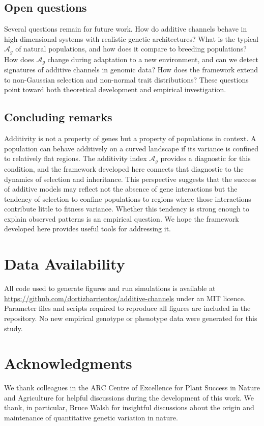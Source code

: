 \documentclass[9pt,twocolumn,twoside,lineno]{gsajnl}
\newcommand{\Ag}{\ensuremath{\mathcal{A}_{g}}\xspace}
\begin{document}
\subsection{Open questions}

Several questions remain for future work. How do additive channels behave in high-dimensional systems with realistic genetic architectures? What is the typical \Ag of natural populations, and how does it compare to breeding populations? How does \Ag change during adaptation to a new environment, and can we detect signatures of additive channels in genomic data? How does the framework extend to non-Gaussian selection and non-normal trait distributions? These questions point toward both theoretical development and empirical investigation.

\subsection{Concluding remarks}

Additivity is not a property of genes but a property of populations in context. A population can behave additively on a curved landscape if its variance is confined to relatively flat regions. The additivity index \Ag provides a diagnostic for this condition, and the framework developed here connects that diagnostic to the dynamics of selection and inheritance. This perspective suggests that the success of additive models may reflect not the absence of gene interactions but the tendency of selection to confine populations to regions where those interactions contribute little to fitness variance. Whether this tendency is strong enough to explain observed patterns is an empirical question. We hope the framework developed here provides useful tools for addressing it.

\section*{Data Availability}
All code used to generate figures and run simulations is available at \url{https://github.com/dortizbarrientos/additive-channels} under an MIT licence. Parameter files and scripts required to reproduce all figures are included in the repository. No new empirical genotype or phenotype data were generated for this study.

\section*{Acknowledgments}
We thank colleagues in the ARC Centre of Excellence for Plant Success in Nature and Agriculture for helpful discussions during the development of this work. We thank, in particular, Bruce Walsh for insightful discussions about the origin and maintenance of quantitative genetic variation in nature. 
\end{document}
